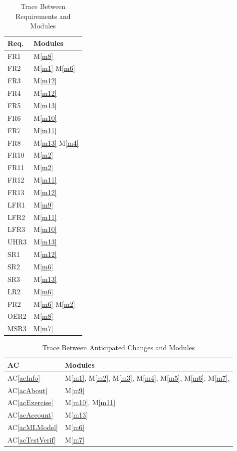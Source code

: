 \documentclass[12pt, titlepage]{article}
\newcommand{\acref}[1]{AC\ref{#1}}
\newcommand{\mref}[1]{M\ref{#1}}
\begin{document}
\begin{table}[H]
\centering
\begin{tabular}{p{} p{}}
\toprule
\textbf{Req.} & \textbf{Modules}\\
\midrule
FR1 & \mref{m8}\\
FR2 & \mref{m1} \mref{m6}\\
FR3 & \mref{m12}\\
FR4 & \mref{m12}\\
FR5 & \mref{m13}\\
FR6 & \mref{m10}\\
FR7 & \mref{m11}\\
FR8 & \mref{m13} \mref{m4}\\
FR10 & \mref{m2}\\
FR11 & \mref{m2}\\
FR12 & \mref{m11}\\
FR13 & \mref{m12}\\
LFR1 & \mref{m9}\\
LFR2 & \mref{m11}\\
LFR3 & \mref{m10}\\
UHR3 & \mref{m13}\\
SR1 & \mref{m12}\\
SR2 & \mref{m6}\\
SR3 & \mref{m13}\\
LR2 & \mref{m6}\\
PR2 & \mref{m6} \mref{m2}\\
OER2 & \mref{m8}\\
MSR3 & \mref{m7}\\
\bottomrule
\end{tabular}
\caption{Trace Between Requirements and Modules}
\label{TblRT}
\end{table}

\begin{table}[H]
\centering
\begin{tabular}{p{} p{}}
\toprule
\textbf{AC} & \textbf{Modules}\\
\midrule
\acref{acInfo} & \mref{m1}, \mref{m2}, \mref{m3}, \mref{m4}, \mref{m5}, \mref{m6}, \mref{m7},\\
\acref{acAbout} & \mref{m9}\\
\acref{acExercise} & \mref{m10}, \mref{m11}\\
\acref{acAccount} & \mref{m13}\\
\acref{acMLModel} & \mref{m6}\\
\acref{acTestVerif} & \mref{m7}\\
\bottomrule
\end{tabular}
\caption{Trace Between Anticipated Changes and Modules}
\label{TblACT}
\end{table}
\end{document}
